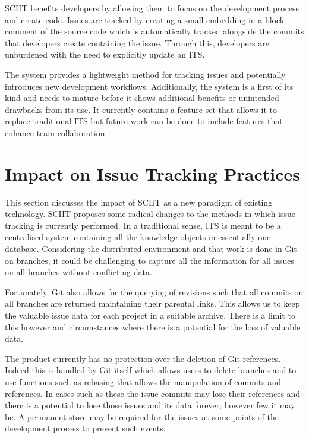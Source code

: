 \documentclass{mproj}
\begin{document}
SCIIT benefits developers by allowing them to focus on the development process and create code. Issues are tracked by creating a small embedding in a block comment of the source code which is automatically tracked alongside the commits that developers create containing the issue. Through this, developers are unburdened with the need to explicitly update an ITS.

The system provides a lightweight method for tracking issues and potentially introduces new development workflows. Additionally, the system is a first of its kind and needs to mature before it shows additional benefits or unintended drawbacks from its use. It currently contains a feature set that allows it to replace traditional ITS but future work can be done to include features that enhance team collaboration.



\section{Impact on Issue Tracking Practices}

This section discusses the impact of SCIIT as a new paradigm of existing technology. SCIIT proposes some radical changes to the methods in which issue tracking is currently performed. In a traditional sense, ITS is meant to be a centralised system containing all the knowledge objects in essentially one database. Considering the distributed environment and that work is done in Git on branches, it could be challenging to capture all the information for all issues on all branches without conflicting data.

Fortunately, Git also allows for the querying of revisions such that all commits on all branches are returned maintaining their parental links. This allows us to keep the valuable issue data for each project in a suitable archive. There is a limit to this however and circumstances where there is a potential for the loss of valuable data.

The product currently has no protection over the deletion of Git references. Indeed this is handled by Git itself which allows users to delete branches and to use functions such as rebasing that allows the manipulation of commits and references. In cases such as these the issue commits may lose their references and there is a potential to lose those issues and its data forever, however few it may be. A permanent store may be required for the issues at some points of the development process to prevent such events.
\end{document}
